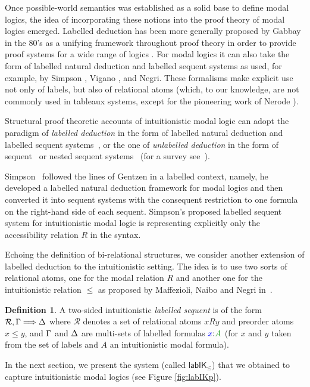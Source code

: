 \documentclass[a4paper]{article}
\theoremstyle{plain}
\theoremstyle{definition}
\newtheorem{definition}[theorem]{Definition}
\newcommand{\B}{\mathcal{R}}
\newcommand*{\lab}{\mathsf{lab}}
\newcommand*{\IK}{\mathsf{IK}}
\newcommand*{\labIKp}{\lab\IK_{\le}}
\newcommand*{\fm}[1]{{\color{notgreen}{#1}}}
\newcommand*{\lb}[1]{{\color{blue}{#1}}}
\newcommand*{\labels}[2]{\lb{#1}\mathord{:}\fm{#2}}
\newcommand{\SEQ}{\Longrightarrow}
\newcommand*{\rel}{R}
\begin{document}
Once possible-world semantics was established as a solid base to define modal logics, the idea of incorporating these notions into the proof theory of modal logics emerged.  Labelled deduction has been more generally proposed by Gabbay in the 80's as a unifying framework throughout proof theory in order to provide proof systems for a wide range of logics \cite{gabbay:96}. For modal logics it can also take the form of labelled natural deduction and labelled sequent systems as used, for example, by Simpson \cite{simpson:phd}, Vigano \cite{vigano:00}, and Negri\cite{negri:jpl2005}. These formalisms make explicit use not only of labels, but also of relational atoms (which, to our knowledge, are not commonly used in tableaux systems, except for the pioneering work of Nerode \cite{nerode:91}).

Structural proof theoretic accounts of intuitionistic modal logic can adopt the paradigm of \emph{labelled deduction} in the form of labelled natural deduction and labelled sequent systems~\cite{simpson:phd}, or the one of \emph{unlabelled deduction} in the form of sequent~\cite{Bierman} or nested sequent systems~\cite{strassburger:fossacs13} (for a survey see~\cite[Chap.~3]{Marin}).

Simpson~\cite{simpson:phd} followed the lines of Gentzen in a labelled context, namely, he developed a labelled natural deduction framework for modal logics and then converted it into sequent systems with the consequent restriction to one formula on the right-hand side of each sequent. Simpson's proposed labelled sequent system for intuitionistic modal logic is representing explicitly only the accessibility relation $\rel$ in the syntax.
%

Echoing the definition of bi-relational structures, we consider another extension of labelled deduction to the intuitionistic setting. 
%
The idea is to use two sorts of relational atoms, one for the modal relation $\rel$ and another one for the intuitionistic relation $\leq$ as proposed by Maffezioli, Naibo and Negri in~\cite{maffezioli:etal:synthese13}. 
%

\begin{definition}
A two-sided intuitionistic \emph{labelled sequent} is of the form $\B, \Left \SEQ \Right$ where $\B$ denotes a set of relational atoms $x \rel y$ and preorder atoms $x \le y$, and $\Gamma$ and $\Delta$ are multi-sets of labelled formulas $\labels{x}{A}$ (for $x$ and $y$ taken from the set of labels and $A$ an intuitionistic modal formula).
\end{definition}
In the next section, we present the system (called $\labIKp$) that we obtained to capture intuitionistic modal logics (see Figure \ref{fig:labIKp}).
\end{document}
